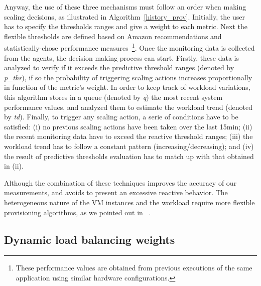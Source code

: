 Anyway, the use of these three mechanisms must follow an order when making scaling decisions, as illustrated in Algorithm~\ref{history_prov}. Initially, the user has to specify the thresholds ranges and give a weight to each metric. Next the flexible thresholds are defined based on Amazon recommendations and statistically-chose performance measures~\footnote{These performance values are obtained from previous executions of the same application using similar hardware configurations.}. Once the monitoring data is collected from the agents, the decision making process can start. Firstly, these data is analyzed to verify if it exceeds the predictive threshold ranges (denoted by \emph{p\_thr}), if so the probability of triggering scaling actions increases proportionally in function of the metric's weight. In order to keep track of workload variations, this algorithm stores in a queue (denoted by \emph{q}) the most recent system performance values, and analyzed them  to estimate the workload trend (denoted by \emph{td}). Finally, to trigger any scaling action, a serie of conditions have to be satisfied: (i) no previous scaling actions have been taken over the last 15min; (ii) the recent monitoring data have to exceed the reactive threshold ranges; (iii) the workload trend has to follow a constant pattern (increasing/decreasing); and (iv) the result of predictive thresholds evaluation has to match up with that obtained in (ii). 


Although the combination of these techniques improves the accuracy of our measurements, and avoids to present an excessive reactive behavior. The heterogeneous nature of the VM instances and the workload require more flexible provisioning algorithms, as we pointed out in ~\cite{jiangThesis}. 

\subsection*{Dynamic load balancing weights}

